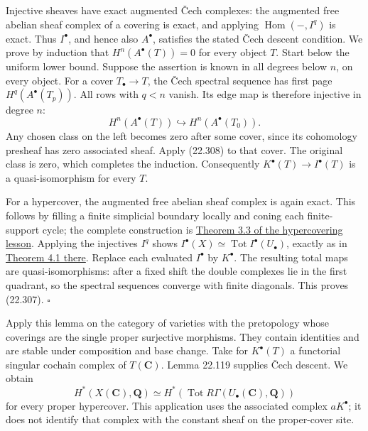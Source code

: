 \documentclass[
  11pt,
  a4paper,
]{article}
\begin{document}
Injective sheaves have exact augmented Čech complexes: the augmented
free abelian sheaf complex of a covering is exact, and applying
\(\operatorname{Hom}(-,I^q)\) is exact. Thus \(I^\bullet\), and hence
also \(A^\bullet\), satisfies the stated Čech descent condition. We
prove by induction that \(H^n(A^\bullet(T))=0\) for every object \(T\).
Start below the uniform lower bound. Suppose the assertion is known in
all degrees below \(n\), on every object. For a cover
\(T_\bullet\to T\), the Čech spectral sequence has first page
\(H^q(A^\bullet(T_p))\). All rows with \(q<n\) vanish. Its edge map is
therefore injective in degree \(n\): \[
 H^n(A^\bullet(T))
       \hookrightarrow H^n(A^\bullet(T_0)).
 \tag{22.308}
\] Any chosen class on the left becomes zero after some cover, since its
cohomology presheaf has zero associated sheaf. Apply (22.308) to that
cover. The original class is zero, which completes the induction.
Consequently \(K^\bullet(T)\to I^\bullet(T)\) is a quasi-isomorphism for
every \(T\).

For a hypercover, the augmented free abelian sheaf complex is again
exact. This follows by filling a finite simplicial boundary locally and
coning each finite-support cycle; the complete construction is
\href{https://kokunoyumeto.github.io/open-math-courses-public/courses/ag-etale-cohomology/hypercoverings.html\#3-hypercoverings-fill-locally}{Theorem
3.3 of the hypercovering lesson}. Applying the injectives \(I^q\) shows
\(I^\bullet(X)\simeq\operatorname{Tot}I^\bullet(U_\bullet)\), exactly as
in
\href{https://kokunoyumeto.github.io/open-math-courses-public/courses/ag-etale-cohomology/hypercoverings.html\#4-the-cochain-complex-and-its-comparison}{Theorem
4.1 there}. Replace each evaluated \(I^\bullet\) by \(K^\bullet\). The
resulting total maps are quasi-isomorphisms: after a fixed shift the
double complexes lie in the first quadrant, so the spectral sequences
converge with finite diagonals. This proves (22.307). \(\square\)

Apply this lemma on the category of varieties with the pretopology whose
coverings are the single proper surjective morphisms. They contain
identities and are stable under composition and base change. Take for
\(K^\bullet(T)\) a functorial singular cochain complex of
\(T(\mathbf C)\). Lemma 22.119 supplies Čech descent. We obtain \[
 H^*(X(\mathbf C),\mathbf Q)
   \simeq H^*\!\left(\operatorname{Tot}
                  R\Gamma(U_\bullet(\mathbf C),\mathbf Q)\right)
 \tag{22.309}
\] for every proper hypercover. This application uses the associated
complex \(aK^\bullet\); it does not identify that complex with the
constant sheaf on the proper-cover site.
\end{document}
